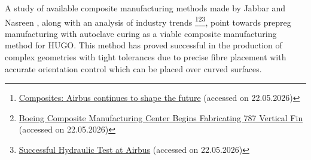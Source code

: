 A study of available composite manufacturing methods made by Jabbar and Nasreen \cite{JABBAR2021177}, along with an analysis of industry trends \footnote{\href{https://www.airbus.com/en/newsroom/news/2017-08-composites-airbus-continues-to-shape-the-future}{Composites: Airbus continues to shape the future} (accessed on 22.05.2026)}\footnote{\href{https://boeing.mediaroom.com/2006-09-19-Boeing-Composite-Manufacturing-Center-Begins-Fabricating-787-Vertical-Fin}{Boeing Composite Manufacturing Center Begins Fabricating 787 Vertical Fin} (accessed on 22.05.2026)}\footnote{\href{https://www.olmar.com/successful-hydraulic-test-at-airbus/}{Successful Hydraulic Test at Airbus} (accessed on 22.05.2026)}, point towards prepreg manufacturing with autoclave curing as a viable composite manufacturing method for HUGO. This method has proved successful in the production of complex geometries with tight tolerances due to precise fibre placement with accurate orientation control which can be placed over curved surfaces. 



